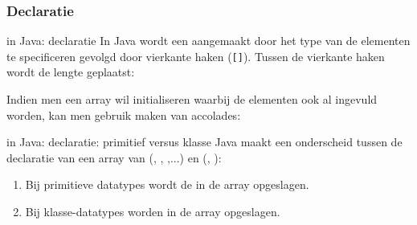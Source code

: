\subsubsection{Declaratie}
\begin{frame}[fragile]{\dsarray{} in Java: declaratie}
In Java wordt een \dsarray{} aangemaakt door het type van de elementen te specificeren gevolgd door vierkante haken (\texttt{[]}). Tussen de vierkante haken wordt de lengte geplaatst:
\begin{hint}
Indien men een array wil initialiseren waarbij de elementen ook al ingevuld worden, kan men gebruik maken van accolades:
\end{hint}
\end{frame}
\begin{frame}[fragile]{\dsarray{} in Java: declaratie: primitief versus klasse}
Java maakt een onderscheid tussen de declaratie van een array van  (\dsint{}, \dsfloat{}, \dslong{},...) en  (\dsobject{}, \dsstring{}):
\begin{enumerate}
 \item Bij primitieve datatypes wordt de  in de array opgeslagen.
 \begin{figure}[H]
 \centering
 \end{figure}
 \item Bij klasse-datatypes worden  in de array opgeslagen.
 \begin{figure}[H]
 \centering
 \end{figure}
\end{enumerate}
\end{frame}

